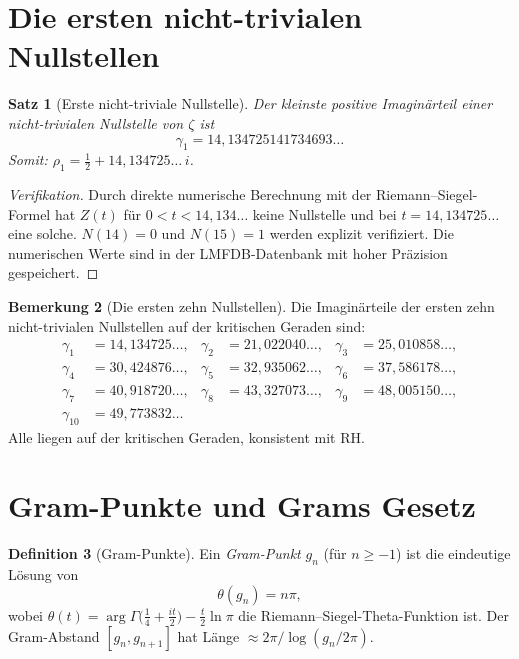 \documentclass[12pt,a4paper]{amsart}
\newtheorem{theorem}{Satz}[section]
\theoremstyle{definition}
\newtheorem{definition}[theorem]{Definition}
\newtheorem{remark}[theorem]{Bemerkung}
\begin{document}
\section{Die ersten nicht-trivialen Nullstellen}

\begin{theorem}[Erste nicht-triviale Nullstelle]
\label{thm:first_zero}
Der kleinste positive Imagin\"arteil einer nicht-trivialen Nullstelle von
$\zeta$ ist
\[
  \gamma_1 = 14{,}134725141734693\ldots
\]
Somit: $\rho_1 = \tfrac{1}{2} + 14{,}134725\ldots\,i$.
\end{theorem}

\begin{proof}[Verifikation]
Durch direkte numerische Berechnung mit der Riemann--Siegel-Formel hat
$Z(t)$ f\"ur $0 < t < 14{,}134\ldots$ keine Nullstelle und bei
$t = 14{,}134725\ldots$ eine solche.
$N(14) = 0$ und $N(15) = 1$ werden explizit verifiziert.
Die numerischen Werte sind in der LMFDB-Datenbank \cite{LMFDB}
mit hoher Pr\"azision gespeichert.
\end{proof}

\begin{remark}[Die ersten zehn Nullstellen]
Die Imagin\"arteile der ersten zehn nicht-trivialen Nullstellen auf der
kritischen Geraden sind:
\begin{align*}
  \gamma_1 &= 14{,}134725\ldots, &
  \gamma_2 &= 21{,}022040\ldots, &
  \gamma_3 &= 25{,}010858\ldots, \\
  \gamma_4 &= 30{,}424876\ldots, &
  \gamma_5 &= 32{,}935062\ldots, &
  \gamma_6 &= 37{,}586178\ldots, \\
  \gamma_7 &= 40{,}918720\ldots, &
  \gamma_8 &= 43{,}327073\ldots, &
  \gamma_9 &= 48{,}005150\ldots, \\
  \gamma_{10} &= 49{,}773832\ldots
\end{align*}
Alle liegen auf der kritischen Geraden, konsistent mit RH.
\end{remark}

\section{Gram-Punkte und Grams Gesetz}

\begin{definition}[Gram-Punkte]
\label{def:gram_points}
Ein \emph{Gram-Punkt} $g_n$ (f\"ur $n \ge -1$) ist die eindeutige L\"osung von
\[
  \theta(g_n) = n\pi,
\]
wobei $\theta(t) = \arg\Gamma\!\bigl(\tfrac{1}{4}+\tfrac{it}{2}\bigr)
- \tfrac{t}{2}\ln\pi$ die Riemann--Siegel-Theta-Funktion ist.
Der Gram-Abstand $[g_n, g_{n+1}]$ hat L\"ange $\approx 2\pi/\log(g_n/2\pi)$.
\end{definition}
\end{document}
